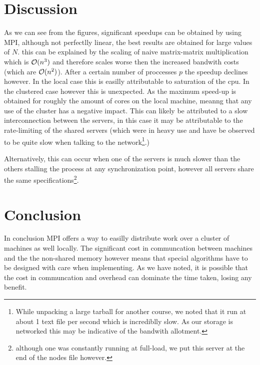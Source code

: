   \section{Discussion}
  As we can see from the figures, significant speedups can be obtained by using MPI, although not perfectlly linear,
  the best results are obtained for large values of $N$. this can be explained by the scaling of naive matrix-matrix multiplication which is $\mathcal{O}(n^3)$ and therefore
  scales worse then the increased bandwith costs (which are $\mathcal{O}(n^2)$). After a certain number of proccesses $p$ the speedup declines however. In the local case this
  is easilly attributable to saturation of the cpu. In the clustered case however this is unexpected. As the maximum speed-up is obtained for roughly the amount of cores on the local machine, meanng that
  any use of the cluster has a negative impact. This can likely be attributed to a slow interconnection
   between the servers, in this case it may be attributable to the rate-limiting of the shared servers
   (which were in heavy use and have be observed to be quite slow when
    talking to the network\footnote{While unpacking a large tarball for another course,
    we noted that it run at about 1 text file per second which is incrediblly slow.
    As our storage is networked this may be indicative of the bandwith allotment.}.)
    \par Alternatively, this can occur when one of the servers is much slower than the others
    stalling the process at any synchronization point, however all servers share the same specifications\footnote{although one was constantly running at full-load, we put this server at the end of the nodes file however.}.

\section{Conclusion}
In conclusion MPI offers a way to easilly distribute work over a cluster of machines as well locally. The significant cost in communcation between machines and the the non-shared memory however means that special
algorithms have to be designed with care when implementing. As we have noted, it is possible that the cost in communcation and overhead can dominate the time taken, losing any benefit.


